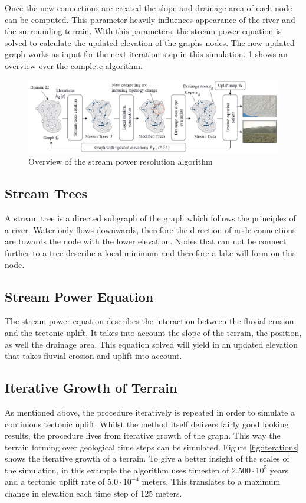 Once the new connections are created the slope and drainage area of each node can be computed. This parameter heavily influences appearance of the river and the surrounding terrain. With this parameters, the stream power equation\cite{JGRB:JGRB11856} is solved to calculate the updated elevation of the graphs nodes. The now updated graph works as input for the next iteration step in this simulation. 
\ref{fig:stream_power_resolution_algorithm} shows an overview over the complete algorithm. 

\begin{figure}[htb]	
	\centering
	\includegraphics[width=\linewidth]{cordonnier2016large/stream_power_resolution_algorithm}
	\caption{Overview of the stream power resolution algorithm}
	\label{fig:stream_power_resolution_algorithm}
\end{figure}

\subsection{Stream Trees}
A stream tree is a directed subgraph of the graph which follows the principles of a river. Water only flows downwards, therefore the direction of node connections are towards the node with the lower elevation. Nodes that can not be connect further to a tree describe a local minimum and therefore a lake will form on this node. 

\subsection{Stream Power Equation}
The stream power equation describes the interaction between the fluvial erosion and the tectonic uplift. It takes into account the slope of the terrain, the position, as well the drainage area. This equation solved will yield in an updated elevation that takes fluvial erosion and uplift into account. 

\subsection{Iterative Growth of Terrain}
As mentioned above, the procedure iteratively is repeated in order to simulate a continious tectonic uplift. Whilst the method itself delivers fairly good looking results, the procedure lives from iterative growth of the graph. This way the terrain forming over geological time steps can be simulated. Figure \ref{fig:iterations} shows the iterative growth of a terrain. To give a better insight of the scales of the simulation, in this example the algorithm uses timestep of $2.500 \cdot 10^5$ years and a tectonic uplift rate of $5.0 \cdot 10^{-4}$ meters. This translates to a maximum change in elevation each time step of 125 meters. 

